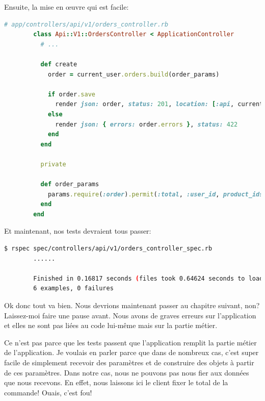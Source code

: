 \documentclass[]{report}
\begin{document}
      Ensuite, la mise en œuvre qui est facile:

      \begin{scriptsize}
        \begin{lstlisting}[language=ruby, caption={Création de l'action de création d'une commande}, label={lst:orders_controller_create}]
        # app/controllers/api/v1/orders_controller.rb
        class Api::V1::OrdersController < ApplicationController
          # ...

          def create
            order = current_user.orders.build(order_params)

            if order.save
              render json: order, status: 201, location: [:api, current_user, order]
            else
              render json: { errors: order.errors }, status: 422
            end
          end

          private

          def order_params
            params.require(:order).permit(:total, :user_id, product_ids: [])
          end
        end
        \end{lstlisting}
      \end{scriptsize}

      Et maintenant, nos tests devraient tous passer:

      \begin{scriptsize}
        \begin{lstlisting}[language=bash]
        $ rspec spec/controllers/api/v1/orders_controller_spec.rb
        ......

        Finished in 0.16817 seconds (files took 0.64624 seconds to load)
        6 examples, 0 failures
        \end{lstlisting}
      \end{scriptsize}

      Ok donc tout va bien. Nous devrions maintenant passer au chapitre suivant, non? Laissez-moi faire une pause avant. Nous avons de graves erreurs sur l'application et elles ne sont pas liées au code lui-même mais sur la partie métier.

      Ce n'est pas parce que les tests passent que l'application remplit la partie métier de l'application. Je voulais en parler parce que dans de nombreux cas, c'est super facile de simplement recevoir des paramètres et de construire des objets à partir de ces paramètres. Dans notre cas, nous ne pouvons pas nous fier aux données que nous recevons. En effet, nous laissons ici le client fixer le total de la commande! Ouais, c'est fou!
\end{document}

